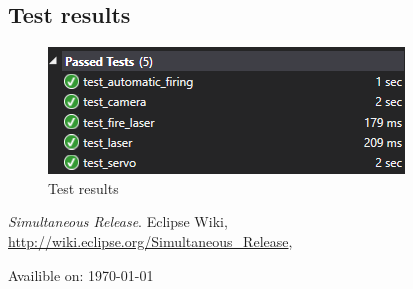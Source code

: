 \documentclass{article}
\begin{document}
\subsection{Test results}
\begin{figure}[H]
\center
\includegraphics{tests.png}
\caption{Test results}
\end{figure}

\begin{thebibliography}{9}

   \emph{Simultaneous Release}.
   Eclipse Wiki,
   \url{http://wiki.eclipse.org/Simultaneous_Release},
   
   Availible on: \today

\end{thebibliography}

\end{document}
